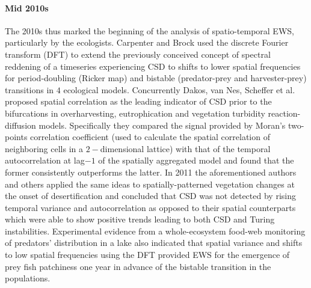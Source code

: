 \documentclass[../main.tex]{subfiles}
\begin{document}
\paragraph{Mid 2010s}
The 2010s thus marked the beginning of the analysis of spatio-temporal EWS, particularly by the ecologists.
Carpenter and Brock \cite{Carpenter10} used the discrete Fourier transform (DFT) to extend the previously conceived concept of spectral reddening of a timeseries experiencing CSD \cite{Kleinen03} to shifts to lower spatial frequencies for period-doubling (Ricker map) and bistable (predator-prey and harvester-prey) transitions in $4$ ecological models.
Concurrently Dakos, van Nes, Scheffer et al. \cite{Dakos10} proposed spatial correlation as the leading indicator of CSD prior to the bifurcations in overharvesting, eutrophication and vegetation turbidity reaction-diffusion models.
Specifically they compared the signal provided by Moran's two-points correlation coefficient (used to calculate the spatial correlation of neighboring cells in a $2-$dimensional lattice) with that of the temporal autocorrelation at lag$-1$ of the spatially aggregated model and found that the former consistently outperforms the latter.
In 2011 the aforementioned authors and others \cite{Dakos11} applied the same ideas to spatially-patterned vegetation changes at the onset of desertification and concluded that CSD was not detected by rising temporal variance and autocorrelation as opposed to their spatial counterparts which were able to show positive trends leading to both CSD and Turing instabilities.
Experimental evidence from a whole-ecosystem food-web monitoring of predators' distribution in a lake \cite{Cline14} also indicated that spatial variance and shifts to low spatial frequencies using the DFT provided EWS for the emergence of prey fish patchiness one year in advance of the bistable transition in the populations.
\end{document}

